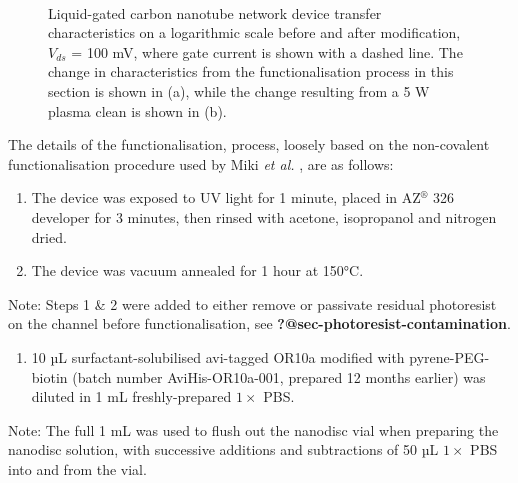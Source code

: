 \documentclass[
  a4paper,
]{scrbook}
\providecommand{\tightlist}{%
  \setlength{\itemsep}{0pt}\setlength{\parskip}{0pt}}\usepackage{longtable,booktabs,array}
\begin{document}
\begin{figure}
\begin{minipage}[t]{0.45\linewidth}
{}

\end{minipage}%
%
\begin{minipage}[t]{0.01\linewidth}

{\centering 

~

}

\end{minipage}%

\caption{\label{fig-OR10a-TX-comparison}Liquid-gated carbon nanotube
network device transfer characteristics on a logarithmic scale before
and after modification, \(V_{ds}\) = 100 mV, where gate current is shown
with a dashed line. The change in characteristics from the
functionalisation process in this section is shown in (a), while the
change resulting from a 5 W plasma clean is shown in (b).}

\end{figure}

The details of the functionalisation, process, loosely based on the
non-covalent functionalisation procedure used by Miki \emph{et al.}
\autocite{Miki2019}, are as follows:

\begin{enumerate}
\def\labelenumi{\arabic{enumi}.}
\item
  The device was exposed to UV light for 1 minute, placed in
  AZ\(^\circledR\) 326 developer for 3 minutes, then rinsed with
  acetone, isopropanol and nitrogen dried.
\item
  The device was vacuum annealed for 1 hour at 150°C.
\end{enumerate}

Note: Steps 1 \& 2 were added to either remove or passivate residual
photoresist on the channel before functionalisation, see
\textbf{?@sec-photoresist-contamination}.

\begin{enumerate}
\def\labelenumi{\arabic{enumi}.}
\setcounter{enumi}{2}
\tightlist
\item
  10 µL surfactant-solubilised avi-tagged OR10a modified with
  pyrene-PEG-biotin (batch number AviHis-OR10a-001, prepared 12 months
  earlier) was diluted in 1 mL freshly-prepared \(1 \times\) PBS.
\end{enumerate}

Note: The full 1 mL was used to flush out the nanodisc vial when
preparing the nanodisc solution, with successive additions and
subtractions of 50 µL \(1 \times\) PBS into and from the vial.
\end{document}
